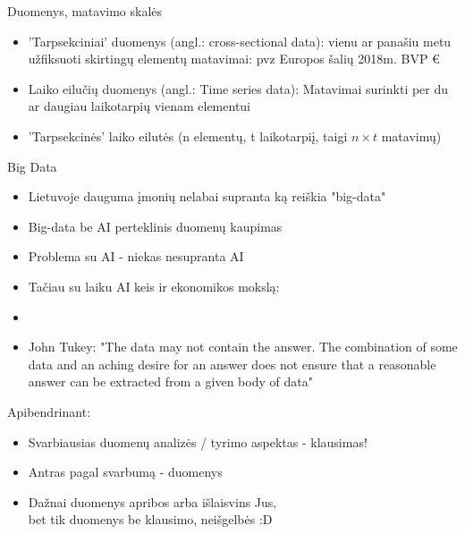 \documentclass[11pt,xcolor=table]{beamer}
\begin{document}

\begin{frame}{Duomenys, matavimo skalės}
\begin{itemize}
\item 'Tarpsekciniai' duomenys (angl.: cross-sectional data): vienu ar panašiu metu užfiksuoti skirtingų elementų matavimai: pvz Europos šalių 2018m. BVP €
\item Laiko eilučių duomenys (angl.: Time series data): Matavimai surinkti per du ar daugiau laikotarpių vienam elementui
\item 'Tarpsekcinės' laiko eilutės (n elementų, t laikotarpiį, taigi $n \times t $ matavimų)
\end{itemize}
\end{frame}

\begin{frame}{Big Data}
\begin{itemize}
\item Lietuvoje dauguma įmonių nelabai supranta ką reiškia "big-data"
\item Big-data be AI perteklinis duomenų kaupimas
\item Problema su AI - niekas nesupranta AI
\item Tačiau su laiku AI keis ir ekonomikos mokslą:
\item \href{https://www.aeaweb.org/webcasts/2019/aea-afa-joint-luncheon-impact-of-machine-learning}{\color{blue}{Video: AEA AFA Joint Luncheon - The Impact of Machine Learning on Econometrics and Economics}}
\item John Tukey: "The data may not contain the answer. The combination of some data and an aching desire for an answer does not ensure that a reasonable answer can be extracted from a given body of data" 
\end{itemize}
\end{frame}


\begin{frame}{Apibendrinant:}
\begin{itemize}
\item Svarbiausias duomenų analizės / tyrimo aspektas - klausimas!
\item Antras pagal svarbumą - duomenys
\item Dažnai duomenys apribos arba išlaisvins Jus, 
\\bet tik duomenys be klausimo, neišgelbės :D
\end{itemize}
\end{frame}
\end{document}
